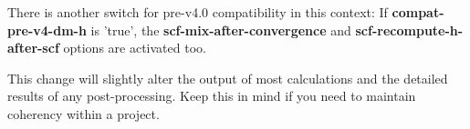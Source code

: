 \documentclass{article}
\newcommand{\opt}[1]{\textbf{#1}}
\begin{document}
\begin{description}
\begin{itemize}
    There is another switch for pre-v4.0 compatibility in this
    context: If \opt{compat-pre-v4-dm-h} is 'true', the
    \opt{scf-mix-after-convergence} and \opt{scf-recompute-h-after-scf}
    options are activated too.

    This change will slightly alter the output of most calculations
    and the detailed results of any post-processing. Keep this in mind
    if you need to maintain coherency within a project.

  \end{itemize}

\end{description}
\end{document}
